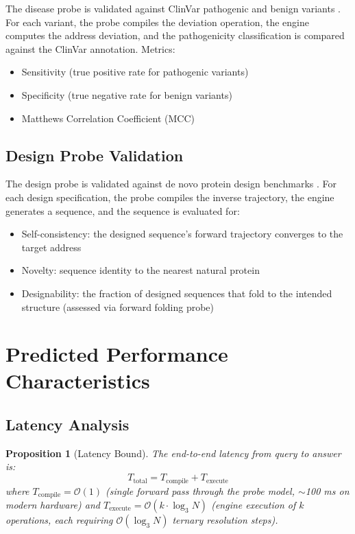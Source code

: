 \documentclass[11pt,twocolumn,a4paper]{article}
\newtheorem{proposition}[theorem]{Proposition}
\theoremstyle{definition}
\theoremstyle{remark}
\begin{document}
The disease probe is validated against ClinVar pathogenic and benign variants \citep{landrum2018}. For each variant, the probe compiles the deviation operation, the engine computes the address deviation, and the pathogenicity classification is compared against the ClinVar annotation. Metrics:
\begin{itemize}
    \item Sensitivity (true positive rate for pathogenic variants)
    \item Specificity (true negative rate for benign variants)
    \item Matthews Correlation Coefficient (MCC)
\end{itemize}

\subsection{Design Probe Validation}

The design probe is validated against de novo protein design benchmarks \citep{huang2016}. For each design specification, the probe compiles the inverse trajectory, the engine generates a sequence, and the sequence is evaluated for:
\begin{itemize}
    \item Self-consistency: the designed sequence's forward trajectory converges to the target address
    \item Novelty: sequence identity to the nearest natural protein
    \item Designability: the fraction of designed sequences that fold to the intended structure (assessed via forward folding probe)
\end{itemize}

\section{Predicted Performance Characteristics}
\label{sec:performance}

\subsection{Latency Analysis}

\begin{proposition}[Latency Bound]
\label{prop:latency}
The end-to-end latency from query to answer is:
\begin{equation}
T_{\text{total}} = T_{\text{compile}} + T_{\text{execute}}
\end{equation}
where $T_{\text{compile}} = \mathcal{O}(1)$ (single forward pass through the probe model, $\sim$100 ms on modern hardware) and $T_{\text{execute}} = \mathcal{O}(k \cdot \log_3 N)$ (engine execution of $k$ operations, each requiring $\mathcal{O}(\log_3 N)$ ternary resolution steps).
\end{proposition}
\end{document}
